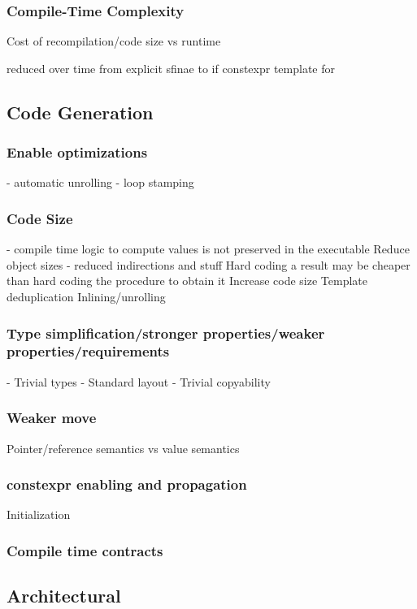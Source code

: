 \documentclass[conference]{IEEEtran}
\begin{document}
\subsubsection{Compile-Time Complexity}
Cost of recompilation/code size vs runtime

reduced over time
from explicit sfinae to 
if constexpr
template for

\subsection{Code Generation}

\subsubsection{Enable optimizations}
    - automatic unrolling
    - loop stamping

\subsubsection{Code Size}
    - compile time logic to compute values is not preserved in the executable
Reduce object sizes
    - reduced indirections and stuff
    Hard coding a result may be cheaper than hard coding the procedure to obtain
    it
Increase code size
    Template deduplication
    Inlining/unrolling

\subsubsection{Type simplification/stronger properties/weaker properties/requirements}
    - Trivial types
    - Standard layout
    - Trivial copyability

\subsubsection{Weaker move}
Pointer/reference semantics vs value semantics

\subsubsection{constexpr enabling and propagation}
Initialization

\subsubsection{Compile time contracts}

\subsection{Architectural}
\end{document}
